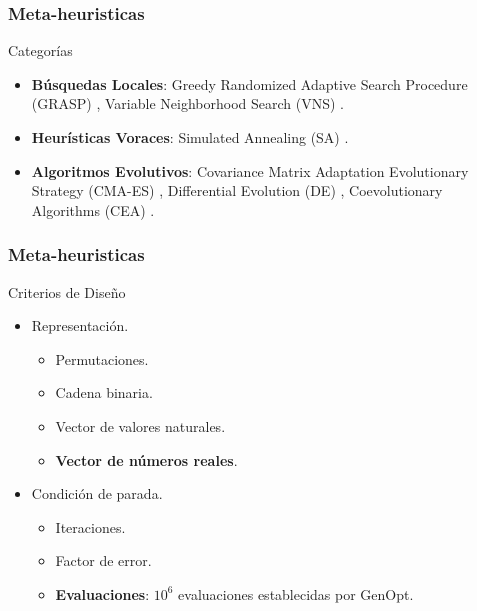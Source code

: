 \begin{frame}
\frametitle{Meta-heuristicas}
\begin{block}{Categorías}
\begin{itemize}
    \item \textbf{Búsquedas Locales}: Greedy Randomized Adaptive Search Procedure (GRASP) \cite{GRASP}, Variable Neighborhood Search (VNS) \cite{vns}.
    \item \textbf{Heurísticas Voraces}: Simulated Annealing (SA) \cite{SA}.
    \item \textbf{Algoritmos Evolutivos}: Covariance Matrix Adaptation Evolutionary Strategy (CMA-ES) \cite{CMA}, Differential Evolution (DE) \cite{DE1, DE2, DE3}, Coevolutionary Algorithms (CEA) \cite{COE1, COE2, COE3}.
\end{itemize}
\end{block}
\end{frame}

\begin{frame}
\frametitle{Meta-heuristicas}
\begin{block}{Criterios de Diseño}
\Fontvi
\begin{itemize}
	\item Representación.
    \begin{itemize}
    \item Permutaciones.
    \item Cadena binaria.
    \item Vector de valores naturales.
    \item \textbf{Vector de números reales}.
\end{itemize}
	\item Condición de parada.
    \begin{itemize}
    \item Iteraciones.
    \item Factor de error.
    \item \textbf{Evaluaciones}: $10^{6}$ evaluaciones establecidas por GenOpt.
\end{itemize}
	\end{itemize}
    \end{block}
\end{frame}

